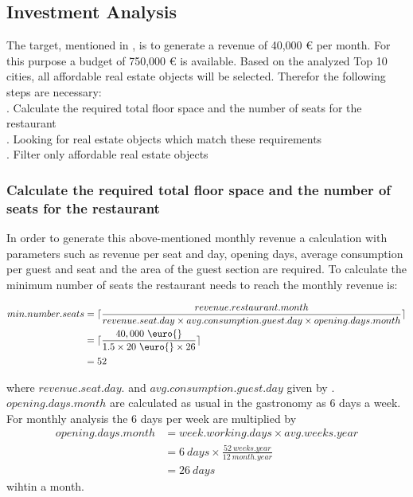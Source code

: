 \subsection{Investment Analysis}
\label{subsec:moneten}
The target, mentioned in , is to generate a revenue of 40,000 \euro{} per month. For this purpose
 a budget of 750,000 \euro{} is available. Based on the analyzed Top 10 cities, all affordable real estate objects will be
 selected. Therefor the following steps are necessary: \\
. Calculate the required total floor space and the number of seats for the restaurant \\
. Looking for real estate objects which match these requirements \\
. Filter only affordable real estate objects \\

\subsubsection{Calculate the required total floor space and the number of seats for the restaurant}
In order to generate this above-mentioned monthly revenue a calculation with parameters such as revenue per seat and day,
 opening days, average consumption per guest and seat and the area of the guest section are required. To calculate the
 minimum number of seats the restaurant needs to reach the monthly revenue is:
\begin{center}
\begin{equation}
\begin{aligned}
	min.number.seats & = \lceil\frac{revenue.restaurant.month}{revenue.seat.day \times avg.consumption.guest.day \times opening.days.month}\rceil \\
	& = \lceil\frac{40,000 \ \text{\euro{}} }{1.5 \times 20 \ \text{\euro{}} \times 26}\rceil \\
	& = 52
\end{aligned}
\label{eq:number_seats_benchmark}
\end{equation}
\end{center}

where $revenue.seat.day.$ and $avg.consumption.guest.day$ given by \cite{BenchmarkGastronomie}. $opening.days.month$
 are calculated as usual in the gastronomy as 6 days a week. For monthly analysis the 6 days per week are multiplied by
\begin{equation}
    \begin{aligned}
        opening.days.month & = week.working.days \times avg.weeks.year \\
        & = 6 \ days \times \frac{52 \ weeks.year}{12 \ month.year} \\
        & = 26 \ days
    \end{aligned}
    \label{eq:opening_days}
\end{equation}
wihtin a month.


